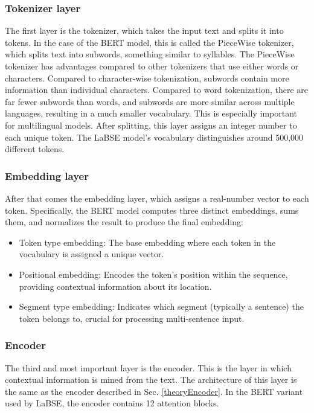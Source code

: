 \subsubsection{Tokenizer layer}

The first layer is the tokenizer, which takes the input text and splits it into tokens. In the case of the BERT model, this is called the PieceWise tokenizer, which splits text into subwords, something similar to syllables. The PieceWise tokenizer has advantages compared to other tokenizers that use either words or characters. Compared to character-wise tokenization, subwords contain more information than individual characters. Compared to word tokenization, there are far fewer subwords than words, and subwords are more similar across multiple languages, resulting in a much smaller vocabulary. This is especially important for multilingual models. After splitting, this layer assigns an integer number to each unique token. The LaBSE model’s vocabulary distinguishes around 500,000 different tokens.

\subsubsection{Embedding layer}

After that comes the embedding layer, which assigns a real-number vector to each token. Specifically, the BERT model computes three distinct embeddings, sums them, and normalizes the result to produce the final embedding:

\begin{itemize}
	\item Token type embedding: The base embedding where each token in the vocabulary is assigned a unique vector.
	\item Positional embedding: Encodes the token’s position within the sequence, providing contextual information about its location.
	\item Segment type embedding: Indicates which segment (typically a sentence) the token belongs to, crucial for processing multi-sentence input.
\end{itemize}

\subsubsection{Encoder}

The third and most important layer is the encoder. This is the layer in which contextual information is mined from the text. The architecture of this layer is the same as the encoder described in Sec. \ref{theoryEncoder}. In the BERT variant used by LaBSE, the encoder contains 12 attention blocks.

